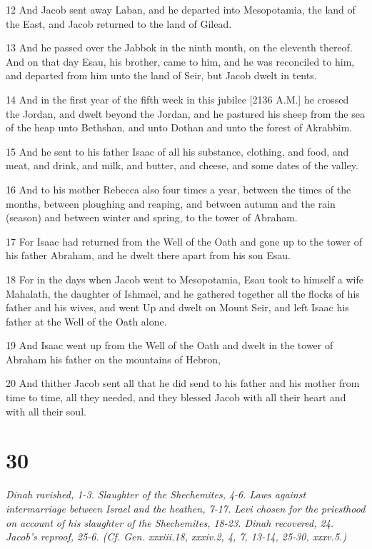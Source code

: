 \par 12 And Jacob sent away Laban, and he departed into Mesopotamia, the land of the East, and Jacob returned to the land of Gilead.
\par 13 And he passed over the Jabbok in the ninth month, on the eleventh thereof. And on that day Esau, his brother, came to him, and he was reconciled to him, and departed from him unto the land of Seir, but Jacob dwelt in tents.
\par 14 And in the first year of the fifth week in this jubilee [2136 A.M.] he crossed the Jordan, and dwelt beyond the Jordan, and he pastured his sheep from the sea of the heap unto Bethshan, and unto Dothan and unto the forest of Akrabbim.
\par 15 And he sent to his father Isaac of all his substance, clothing, and food, and meat, and drink, and milk, and butter, and cheese, and some dates of the valley.
\par 16 And to his mother Rebecca also four times a year, between the times of the months, between ploughing and reaping, and between autumn and the rain (season) and between winter and spring, to the tower of Abraham.
\par 17 For Isaac had returned from the Well of the Oath and gone up to the tower of his father Abraham, and he dwelt there apart from his son Esau.
\par 18 For in the days when Jacob went to Mesopotamia, Esau took to himself a wife Mahalath, the daughter of Ishmael, and he gathered together all the flocks of his father and his wives, and went Up and dwelt on Mount Seir, and left Isaac his father at the Well of the Oath alone.
\par 19 And Isaac went up from the Well of the Oath and dwelt in the tower of Abraham his father on the mountains of Hebron,
\par 20 And thither Jacob sent all that he did send to his father and his mother from time to time, all they needed, and they blessed Jacob with all their heart and with all their soul.

\chapter{30}

\par \textit{Dinah ravished, 1-3. Slaughter of the Shechemites, 4-6. Laws against intermarriage between Israel and the heathen, 7-17. Levi chosen for the priesthood on account of his slaughter of the Shechemites, 18-23. Dinah recovered, 24. Jacob's reproof, 25-6. (Cf. Gen. xxxiii.18, xxxiv.2, 4, 7, 13-14, 25-30, xxxv.5.)}

